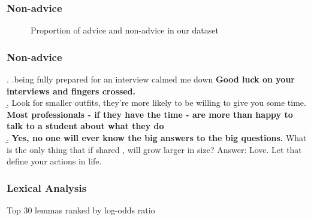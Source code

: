\begin{frame}[c]\frametitle{Non-advice}
    \pause
    \centering
    \begin{figure}
    \caption{Proportion of advice and non-advice in our dataset}
    \end{figure}
\end{frame}

\begin{frame}[c]\frametitle{Non-advice}

\ex. \a.\label{ex:nona-1}\textellipsis being fully prepared for an interview calmed me down \textellipsis \textbf<2->{ Good luck on your interviews and fingers crossed. } \\
     \b.\label{ex:nona-2}  Look for smaller outfits, they’re more likely to be willing to give you some time. \textbf<3->{Most professionals - if they have the time - are more than happy to talk to a student about what they do\textellipsis} \\
     \b. \label{ex:nona-3} \textbf<4->{Yes, no one will ever know the big answers to the big questions.} What is the only thing that if shared , will grow larger in size? Answer: Love. Let that define your actions in life. \\

\end{frame}

\begin{frame}\frametitle{Lexical Analysis}

    \pause

    \begin{table}[t]
        \centering
        \small
        
        \caption{Top 30 lemmas ranked by log-odds ratio}
        \label{tab:logodds}
    \end{table}
\end{frame}

